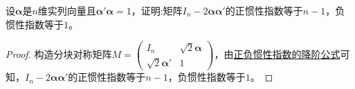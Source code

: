 \documentclass[../../main.tex]{subfiles}%
\begin{document}
\begin{proposition}
设\(\boldsymbol{\alpha}\)是\(n\)维实列向量且\(\boldsymbol{\alpha}'\boldsymbol{\alpha}=1\)，证明:矩阵\(I_n - 2\boldsymbol{\alpha}\boldsymbol{\alpha}'\)的正惯性指数等于\(n - 1\)，负惯性指数等于\(1\)。
\end{proposition}
\begin{proof}
构造分块对称矩阵\(M = \begin{pmatrix}
I_n & \sqrt{2}\boldsymbol{\alpha} \\
\sqrt{2}\boldsymbol{\alpha}' & 1
\end{pmatrix}\)，由\hyperref[proposition:正负惯性指数的降阶公式]{正负惯性指数的降阶公式}可知，\(I_n - 2\boldsymbol{\alpha}\boldsymbol{\alpha}'\)的正惯性指数等于\(n - 1\)，负惯性指数等于\(1\)。
\end{proof}
\end{document}
